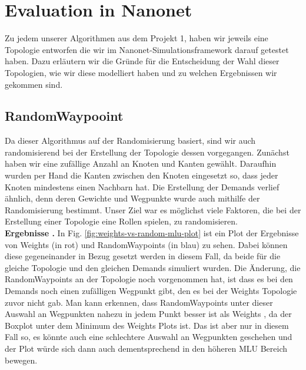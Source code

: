 \documentclass[sigconf,noacm,review]{acmart}
\begin{document}
\section{Evaluation in Nanonet}
Zu jedem unserer Algorithmen aus dem Projekt 1, haben wir jeweils eine Topologie entworfen die wir im Nanonet-Simulationsframework \cite{repository-project2} darauf getestet haben. Dazu erläutern wir die Gründe für die Entscheidung der Wahl dieser Topologien, wie wir diese modelliert haben und zu welchen Ergebnissen wir gekommen sind.

\subsection{RandomWaypooint}
Da dieser Algorithmus auf der Randomisierung basiert, sind wir auch randomisierend bei der Erstellung der Topologie dessen vorgegangen. Zunächst haben wir eine zufällige Anzahl an Knoten und Kanten gewählt. Daraufhin wurden per Hand die Kanten zwischen den Knoten eingesetzt so, dass jeder Knoten mindestens einen Nachbarn hat. Die Erstellung der Demands verlief ähnlich, denn deren Gewichte und Wegpunkte wurde auch mithilfe der Randomisierung bestimmt. Unser Ziel war es möglichst viele Faktoren, die bei der  Erstellung einer Topologie eine Rollen spielen, zu randomisieren. \\
\textbf{Ergebnisse .}
In Fig.  \ref{fig:weights-vs-random-mlu-plot} ist ein Plot der Ergebnisse von Weights (in rot) und RandomWaypoints (in blau) zu sehen. Dabei können diese gegeneinander in Bezug gesetzt werden in diesem Fall, da beide für die gleiche Topologie und den gleichen Demands simuliert wurden. Die Änderung, die RandomWaypoints an der Topologie noch vorgenommen hat, ist dass es bei den Demands noch einen zufälligen Wegpunkt gibt, den es bei der Weights Topologie zuvor nicht gab. Man kann erkennen, dass RandomWaypoints unter dieser Auswahl an Wegpunkten nahezu in jedem Punkt besser ist als Weights , da der Boxplot unter dem Minimum des Weights Plots ist. Das ist aber nur in diesem Fall so, es könnte auch eine schlechtere Auswahl an Wegpunkten geschehen und der Plot würde sich dann auch dementsprechend in den höheren MLU Bereich bewegen. 
\end{document}
